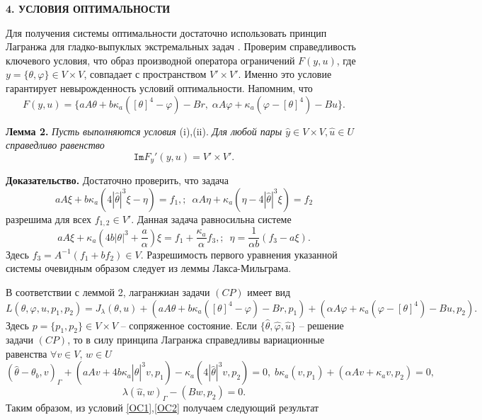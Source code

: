 \documentclass[12pt]{article}
\begin{document}
    \begin{center}
        \textbf{4. УСЛОВИЯ ОПТИМАЛЬНОСТИ}
    \end{center}

    Для получения системы оптимальности достаточно использовать
    принцип Лагранжа для гладко-выпуклых экстремальных задач \cite{10,11}.
    Проверим справедливость ключевого условия, что образ производной
    оператора ограничений $F(y, u)$, где $y=\{\theta,\varphi\}\in V\times V$,
    совпадает с пространством $V'\times V'.$ Именно это условие гарантирует
    невырожденность условий оптимальности.
    Напомним, что
    $$
    F(y, u) = \{ aA\theta + b \kappa_a ( [\theta]^4- \varphi) - Br,\;
    \alpha A \varphi + \kappa_a (\varphi -[\theta]^4) - Bu\}.$$


    \textbf{Лемма 2.}
    {\it
    Пусть выполняются условия} (i),(ii).
        {\it Для любой пары $\hat{y} \in V \times V, \hat{u} \in U$ справедливо равенство}
    \[
        \texttt{Im}F_y'(y, u) = V' \times V'.
    \]


        {\bf Доказательство.} Достаточно проверить, что задача
    $$
    aA \xi + b \kappa_a (4|\hat{\theta}|^3 \xi - \eta) = f_1, ;\ \;
    \alpha A \eta + \kappa_a (\eta - 4|\hat{\theta}|^3 \xi) = f_2
    $$
    разрешима для всех $f_{1,2}\in V'.$ Данная задача равносильна системе
    $$
    aA\xi + \kappa_a\left(4b|\theta|^3 + \frac{a}{\alpha}\right) \xi = f_1
    +\frac{\kappa_a}{\alpha}f_3, ;\ \;
    \eta =\frac{1}{\alpha b}( f_3-a\xi).
    $$
    Здесь $f_3=A^{-1}(f_1+bf_2)\in V.$ Разрешимость первого уравнения указанной системы очевидным образом следует из леммы Лакса-Мильграма.


    В соответствии с леммой 2, лагранжиан задачи $(CP)$ имеет вид
    $$
    L(\theta, \varphi, u, p_1, p_2) = J_\lambda(\theta, u)
    + (aA\theta + b\kappa_a([\theta]^4 - \varphi) - Br, p_1)
    + (\alpha A \varphi + \kappa_a(\varphi - [\theta]^4) - Bu, p_2).
    $$
    Здесь $p=\{p_1,p_2\}\in V\times V$ -- сопряженное состояние.
    Если $\{\hat{\theta}, \hat{\varphi}, \hat{u} \}$ -- решение задачи $(CP)$, то
    в силу принципа Лагранжа \cite[Теорема 1.5]{10} справедливы вариационные равенства
    $\forall v\in V,\, w\in U$
    \begin{equation}
        \label{OC1}
        (\hat{\theta} -\theta_b, v)_\Gamma + (aAv + 4 b\kappa_a |\hat{\theta}|^3v, p_1)
        - \kappa_a ( 4 |\hat{\theta}|^3v, p_2) = 0,\;
        b \kappa_a (v, p_1)+ (\alpha A v + \kappa_a v, p_2) = 0,
    \end{equation}
    \begin{equation}
        \label{OC2}
        \lambda(\hat{u},w)_\Gamma - (Bw, p_2) = 0.
    \end{equation}
    Таким образом, из условий \eqref{OC1},\eqref{OC2}
    получаем следующий результат
\end{document}
